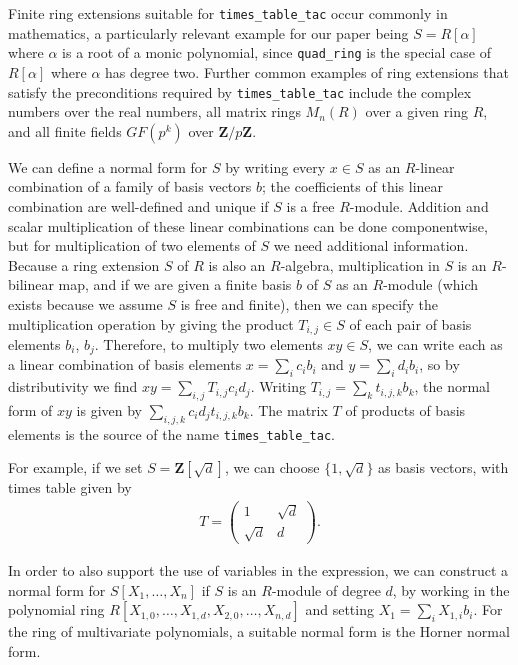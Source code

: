 \documentclass[sigplan,10pt,nonacm,
screen]{acmart} \settopmatter{printfolios=true,printccs=false,printacmref=false}
\newcommand{\ZZ}{\mathbf{Z}}
\begin{document}
Finite ring extensions suitable for \lstinline{times_table_tac} occur commonly in mathematics,
a particularly relevant example for our paper being $S = R[\alpha]$ where $\alpha$ is a root of a monic polynomial,
since \lstinline{quad_ring} is the special case of $R[\alpha]$ where $\alpha$ has degree two.
Further common examples of ring extensions that satisfy the preconditions required by \lstinline{times_table_tac} include
the complex numbers over the real numbers,
all matrix rings $M_{n}(R)$ over a given ring $R$,
and all finite fields $GF(p^k)$ over $\ZZ/p\ZZ$.

We can define a normal form for $S$ by writing every $x \in S$ as an $R$-linear combination of a family of basis vectors $b$;
the coefficients of this linear combination are well-defined and unique if $S$ is a free $R$-module.
Addition and scalar multiplication of these linear combinations can be done componentwise,
but for multiplication of two elements of $S$ we need additional information.
Because a ring extension $S$ of $R$ is also an $R$-algebra, multiplication in $S$ is an $R$-bilinear map,
and if we are given a finite basis $b$ of $S$ as an $R$-module (which exists because we assume $S$ is free and finite),
then we can specify the multiplication operation by giving the product $T_{i, j} \in S$ of each pair of basis elements $b_i$, $b_j$.
Therefore, to multiply two elements $x y \in S$, we can write each as a linear combination of basis elements $x = \sum_i c_i b_i$ and $y = \sum_i d_i b_i$,
so by distributivity we find $xy = \sum_{i, j} T_{i, j} c_i d_j$.
Writing $T_{i, j} = \sum_k t_{i, j, k} b_k$, the normal form of $xy$ is given by $\sum_{i, j, k} c_i d_j t_{i, j, k} b_k$.
The matrix $T$ of products of basis elements is the source of the name \lstinline{times_table_tac}.

For example, if we set $S = \ZZ[\sqrt d]$, we can choose $\{1, \sqrt d\}$ as basis vectors,
with times table given by
\begin{align*}
	T = \begin{pmatrix}
		1 & \sqrt d \\
		\sqrt d & d
	\end{pmatrix}.
\end{align*}

In order to also support the use of variables in the expression,
we can construct a normal form for $S[X_1, \dots, X_n]$ if $S$ is an $R$-module of degree $d$,
by working in the polynomial ring $R[X_{1, 0}, \dots, X_{1, d}, X_{2, 0}, \dots, X_{n, d}]$
and setting $X_1 = \sum_i X_{1, i} b_i$.
For the ring of multivariate polynomials, a suitable normal form is the Horner normal form.
\end{document}
